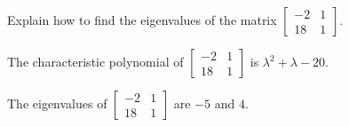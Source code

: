 
\begin{exerciseStatement}


Explain how to find the eigenvalues of the matrix \( \left[\begin{array}{cc}
-2 & 1 \\
18 & 1
\end{array}\right] \).


\end{exerciseStatement}
    
\begin{exerciseAnswer} 


The characteristic polynomial of \( \left[\begin{array}{cc}
-2 & 1 \\
18 & 1
\end{array}\right] \) is \( \lambda^{2} + \lambda - 20 \).



The eigenvalues of \( \left[\begin{array}{cc}
-2 & 1 \\
18 & 1
\end{array}\right] \) are \( -5 \) and \( 4 \).


\end{exerciseAnswer}
    
